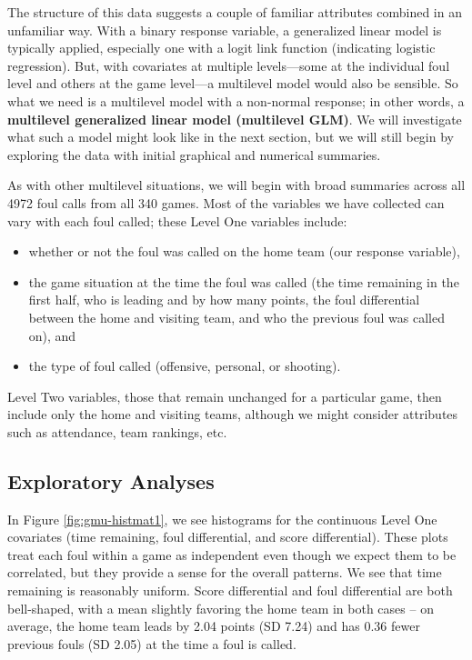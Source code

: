 \documentclass[
]{krantz}
\providecommand{\tightlist}{%
  \setlength{\itemsep}{0pt}\setlength{\parskip}{0pt}}
\begin{document}
The structure of this data suggests a couple of familiar attributes combined in an unfamiliar way. With a binary response variable, a generalized linear model is typically applied, especially one with a logit link function (indicating logistic regression). But, with covariates at multiple levels---some at the individual foul level and others at the game level---a multilevel model would also be sensible. So what we need is a multilevel model with a non-normal response; in other words, a \textbf{multilevel generalized linear model (multilevel GLM)}.  We will investigate what such a model might look like in the next section, but we will still begin by exploring the data with initial graphical and numerical summaries.

As with other multilevel situations, we will begin with broad summaries across all 4972 foul calls from all 340 games. Most of the variables we have collected can vary with each foul called; these Level One variables include:

\begin{itemize}
\tightlist
\item
  whether or not the foul was called on the home team (our response variable),
\item
  the game situation at the time the foul was called (the time remaining in the first half, who is leading and by how many points, the foul differential between the home and visiting team, and who the previous foul was called on), and
\item
  the type of foul called (offensive, personal, or shooting).
\end{itemize}

Level Two variables, those that remain unchanged for a particular game, then include only the home and visiting teams, although we might consider attributes such as attendance, team rankings, etc.

\hypertarget{glmm-eda}{%
\subsection{Exploratory Analyses}\label{glmm-eda}}

In Figure \ref{fig:gmu-histmat1}, we see histograms for the continuous Level One covariates (time remaining, foul differential, and score differential). These plots treat each foul within a game as independent even though we expect them to be correlated, but they provide a sense for the overall patterns. We see that time remaining is reasonably uniform. Score differential and foul differential are both bell-shaped, with a mean slightly favoring the home team in both cases -- on average, the home team leads by 2.04 points (SD 7.24) and has 0.36 fewer previous fouls (SD 2.05) at the time a foul is called.
\end{document}
